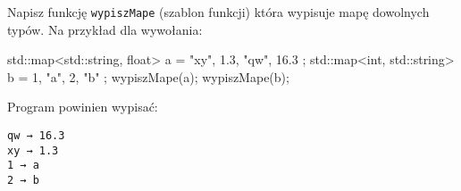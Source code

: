 % 
% 
% 
% 



\dbEntryCheckResults
Napisz funkcję \Verb#wypiszMape# (szablon funkcji) która wypisuje mapę dowolnych typów. Na przykład dla wywołania:
\begin{CodeFrame*}[cpp]{}
std::map<std::string, float> a = { {"xy", 1.3}, {"qw", 16.3} };
std::map<int, std::string> b = { {1, "a"}, {2, "b"} };
wypiszMape(a);
wypiszMape(b);
\end{CodeFrame*}
\vspace{-8pt}Program powinien wypisać:
\vspace{-8pt}\begin{Verbatim}
qw → 16.3
xy → 1.3
1 → a
2 → b
\end{Verbatim}
\fi

